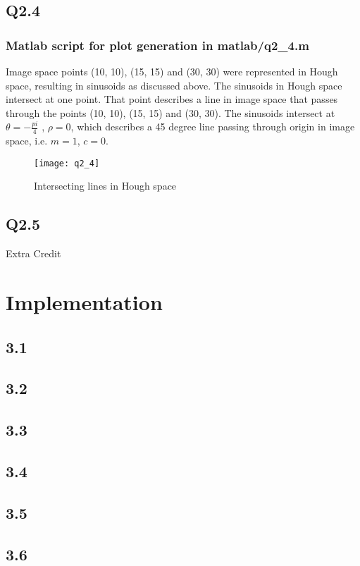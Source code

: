 \documentclass[12pt]{article}
\begin{document}
\subsection{Q2.4  }
\subsubsection{ Matlab script for plot generation in matlab/q2_4.m}
Image space points (10, 10), (15, 15) and (30, 30) were represented in Hough space, resulting in sinusoids as discussed above. The sinusoids in Hough space intersect at one point. That point describes a line in image space that passes through the points (10, 10), (15, 15) and (30, 30). The sinusoids intersect at $\theta = - \frac{pi}{4}$ , $\rho = 0$, which describes a 45 degree line passing through origin in image space, i.e. $m=1$, $c=0$.



\begin{figure}[H]
\centering
\texttt{[image: q2\_4]}
\caption{Intersecting lines in Hough space}    
\label{fig:bblr}
\end{figure}   


\subsection{Q2.5  }
Extra Credit

\section{Implementation}

\subsection{3.1}
\subsection{3.2}
\subsection{3.3}
\subsection{3.4}
\subsection{3.5}
\subsection{3.6}
\end{document}
